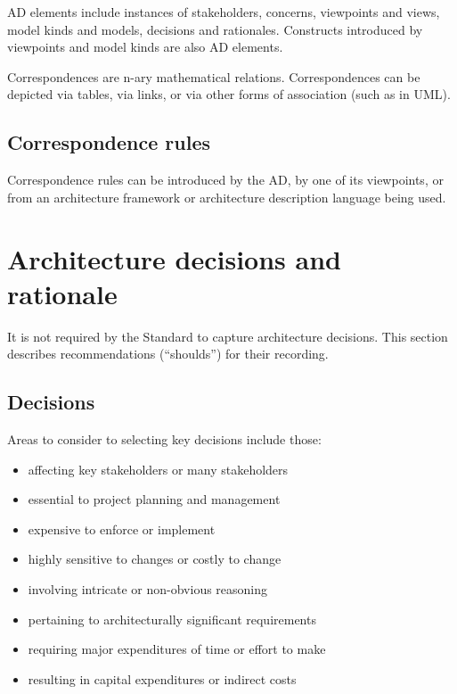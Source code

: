 \documentclass[10pt,oneside]{report}
\begin{document}
AD elements include instances of stakeholders, concerns, viewpoints and
views, model kinds and models, decisions and rationales. Constructs
introduced by viewpoints and model kinds are also AD elements.

Correspondences are n-ary mathematical relations. Correspondences can
be depicted via tables, via links, or via other forms of association
(such as in UML).



\section{Correspondence rules}


Correspondence rules can be introduced by the AD, by one of its
viewpoints, or from an architecture framework or architecture
description language being used.




\appendix
\chapter{Architecture decisions and rationale}\label{ch:decisions}

It is not required by the Standard to capture architecture
decisions. This section describes recommendations (``shoulds'') for
their recording.

\section{Decisions}



Areas to consider to selecting key decisions include those:
\begin{itemize}
\item affecting key stakeholders or many stakeholders
\item essential to project planning and management
\item expensive to enforce or implement
\item highly sensitive to changes or costly to change
\item involving intricate or non-obvious reasoning
\item pertaining to architecturally significant requirements
\item requiring major expenditures of time or effort to make
\item resulting in capital expenditures or indirect costs
\end{itemize}
\end{document}
